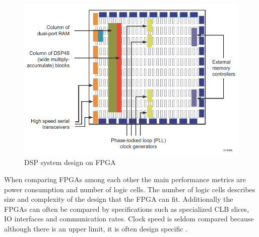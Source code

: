 \documentclass[12pt]{report}
\begin{document}
\begin{figure}[h]
    \centering
    \includegraphics[scale=0.5]{figures/contemporary_fpga.png}
    \caption{DSP system design on FPGA \citep{XilFPGAIntro}}
    \label{fig:5}
\end{figure}

When comparing FPGAs among each other the main performance metrics are power consumption and number of logic cells. The number of logic cells describes size and complexity of the design that the FPGA can fit. Additionally the FPGAs can often be compared by specifications such as specialized CLB slices, IO interfaces and communication rates. Clock speed is seldom compared because although there is an upper limit, it is often design specific \citep{XilClbMan} \citep{XilFPGAIntro}. 
\end{document}
